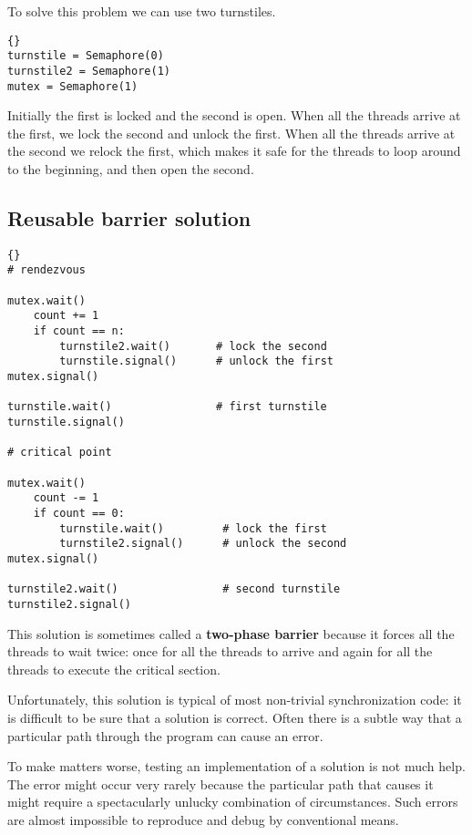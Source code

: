 \documentclass{book}
\newcommand{\clearemptydoublepage}{\newpage\cleardoublepage}
\begin{document}
To solve this problem we can use two turnstiles.

\begin{lstlisting}[title={Reusable barrier hint}]{}
turnstile = Semaphore(0)
turnstile2 = Semaphore(1)
mutex = Semaphore(1)
\end{lstlisting}

Initially the first is locked and the second is open.  When all the
threads arrive at the first, we lock the second and unlock the first.
When all the threads arrive at the second we relock the first,
which makes it safe for the threads to loop around to the beginning,
and then open the second.



\clearemptydoublepage
\subsection {Reusable barrier solution}

\begin{lstlisting}[title={Reusable barrier solution}]{}
# rendezvous

mutex.wait()
    count += 1
    if count == n:
        turnstile2.wait()       # lock the second
        turnstile.signal()      # unlock the first
mutex.signal()

turnstile.wait()                # first turnstile
turnstile.signal()

# critical point

mutex.wait()
    count -= 1
    if count == 0: 
        turnstile.wait()         # lock the first
        turnstile2.signal()      # unlock the second
mutex.signal()

turnstile2.wait()                # second turnstile
turnstile2.signal()
\end{lstlisting}

This solution is sometimes called a {\bf two-phase barrier} because
it forces all the threads to wait twice: once for all the threads
to arrive and again for all the threads to execute the critical
section.

Unfortunately, this solution is typical of most non-trivial
synchronization code: it is difficult to be sure that a solution is
correct.  Often there is a subtle way that a particular path through
the program can cause an error.

To make matters worse, testing an implementation of a solution
is not much help.  The error might occur very rarely
because the particular path that causes it might
require a spectacularly unlucky combination of circumstances.
Such errors are almost
impossible to reproduce and debug by conventional means.
\end{document}
